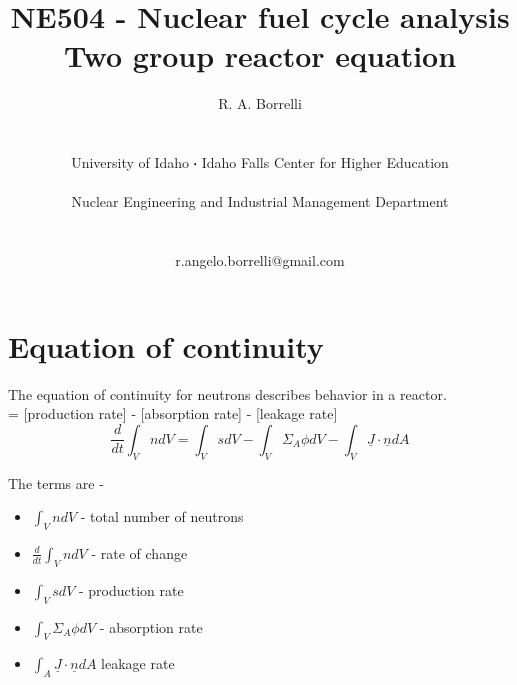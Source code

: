\documentclass[11pt,a4paper]{article}
\newcommand*\sq{\mathbin{\vcenter{\hbox{\rule{.3ex}{.3ex}}}}} %
\begin{document}
\begin{titlepage}
    \title{
        NE504 - Nuclear fuel cycle analysis\\
        Two group reactor equation\\
    }
    \author{
        R. A. Borrelli
        \\ \\ \\
        University of Idaho $\sq$ Idaho Falls Center for Higher Education
        \\ \\
        Nuclear Engineering and Industrial Management Department
        \\ \\ \\
        r.angelo.borrelli@gmail.com
    }
\clearpage %
\maketitle
\thispagestyle{empty} %
\end{titlepage}

\section{Equation of continuity}
\noindent The equation of continuity for neutrons describes behavior in a reactor.\\

 = [production rate] - [absorption rate] - [leakage rate]\\

\begin{equation} \label{eq-1-continuity}
    \frac{d}{dt}\int_V ndV=\int_V sdV-\int_V\Sigma_A\phi dV-\int_V\underline{J}\cdot\underline{n}dA
\end{equation}

\noindent The terms are - 
\begin{itemize}[leftmargin=*,topsep=0pt]
    \item $\int_V ndV$ - total number of neutrons
    \item $\frac{d}{dt} \int_V ndV$ - rate of change
    \item $\int_V sdV$ - production rate
    \item $\int_V \Sigma_A \phi dV$ - absorption rate
    \item $\int_A \underline{J} \cdot \underline{n} dA$ leakage rate
\end{itemize}
\vspace{\baselineskip}
\end{document}
